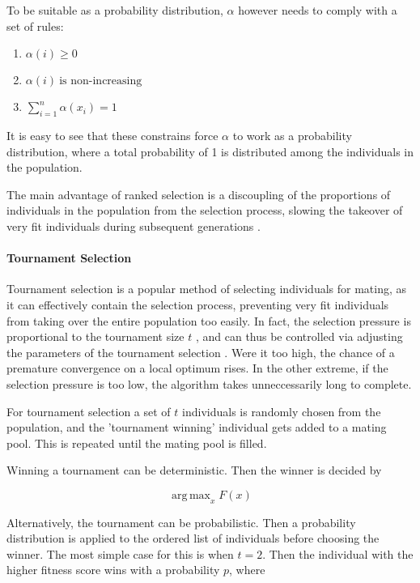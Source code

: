 \documentclass[11pt,a4paper,twoside,openright]{scrbook}
\begin{document}
To be suitable as a probability distribution, \(\alpha\) however needs to comply with a set of rules:
\newpage
\begin{enumerate}
  \item \(\alpha (i) \geq 0\)
  \item \(\alpha (i) \ \text{is non-increasing}\)
  \item \(\sum_{i=1}^n\alpha (x_i) = 1\)
\end{enumerate}

It is easy to see that these constrains force \(\alpha\) to work as a probability distribution, where a total probability of 1 is distributed among the individuals in the population.

\medskip
The main advantage of ranked selection is a discoupling of the proportions of individuals in the population from the selection process, slowing the takeover of very fit individuals during subsequent generations \cite[p.\,77]{Goldberg91}.

\paragraph{Tournament Selection}

Tournament selection is a popular method of selecting individuals for mating, as it can effectively contain the selection process, preventing very fit individuals from taking over the entire population too easily. In fact, the selection pressure is proportional to the tournament size \(t\) \cite[p.\,194]{Miller95}, and can thus be controlled via adjusting the parameters of the tournament selection \cite{Miller95}. Were it too high, the chance of a premature convergence on a local optimum rises. In the other extreme, if the selection pressure is too low, the algorithm takes unneccessarily long to complete.

For tournament selection a set of \(t\) individuals is randomly chosen from the population, and the 'tournament winning' individual gets added to a mating pool. This is repeated until the mating pool is filled.

Winning a tournament can be deterministic. Then the winner is decided by

\[\operatorname{arg\,max}_x F(x) \]

Alternatively, the tournament can be probabilistic. Then a probability distribution is applied to the ordered list of individuals before choosing the winner.
The most simple case for this is when \(t = 2\). Then the individual with the higher fitness score wins with a probability \(p\), where
\end{document}

